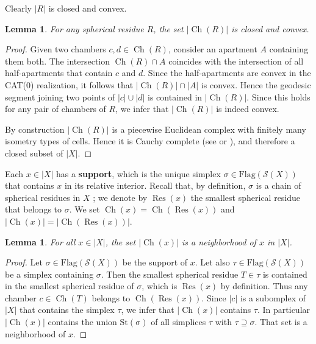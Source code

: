 \documentclass[12pt,a4paper]{amsproc}
\newtheorem{lemma}[theorem]{Lemma}
\theoremstyle{definition}
\DeclareMathOperator{\Ch}{Ch}
\DeclareMathOperator{\Res}{Res}
\begin{document}
Clearly $|R|$ is closed and convex. 

\begin{lemma}\label{lem:Ch(R)}
For any spherical residue $R$, the set $|\Ch(R)|$ is closed and convex. 
\end{lemma}
\begin{proof}
Given two chambers $c, d \in \Ch(R)$, consider an apartment $A$ containing them both. The intersection $\Ch(R) \cap A$ coincides with the intersection of all half-apartments that contain $c$ and $d$. Since the half-apartments are convex in the CAT($0$) realization, it follows that $|\Ch(R)| \cap |A|$ is convex. Hence the geodesic segment joining two points of $|c| \cup |d|$ is contained in $|\Ch(R)|$. Since this holds for any pair of chambers of $R$, we infer that $|\Ch(R)|$ is indeed convex. 

By construction $|\Ch(R)|$ is a piecewise Euclidean complex with finitely many isometry types of cells. Hence it is Cauchy complete (see \cite[pp.~105--111]{BH99} or \cite[Proposition~I.3.4]{Davis}), and therefore   a closed subset of $|X|$. 
\end{proof}
		

Each $x \in |X|$ has a \textbf{support}, which is the unique simplex $\sigma \in \mathrm{Flag}(\mathcal S(X))$ that contains $x$ in its relative interior. Recall that, by definition, $\sigma$ is a chain of spherical residues in $X$ ; we denote by $\Res(x)$ the smallest spherical residue that belongs to $\sigma$.
We set $\Ch(x) = \Ch(\Res(x))$ and $|\Ch(x)| = |\Ch(\Res(x))|$.


\begin{lemma}\label{lem:Ch(x)}
For all $x \in |X|$, the set $|\Ch(x)|$ is a neighborhood of $x$ in $|X|$.
\end{lemma}
\begin{proof}
Let $\sigma\in \mathrm{Flag}(\mathcal S(X))$ be the support of $x$. Let also $\tau \in \mathrm{Flag}(\mathcal S(X))$ be a simplex  containing $\sigma$. Then the smallest spherical residue $T\in \tau$ is contained in the smallest spherical residue of $\sigma$, which is $\Res(x)$ by definition. Thus any chamber $c \in \Ch(T)$ belongs to $\Ch(\Res(x))$. Since $|c|$ is a subomplex of $|X|$ that contains the simplex $\tau$, we infer that $|\Ch(x)|$ contains $\tau$. In particular $|\Ch(x)|$ contains the union $\mathrm{St(\sigma)}$ of all simplices $\tau$ with $\tau \supseteq \sigma$. That set  is a neighborhood of $x$.
\end{proof}
	
	
\end{document}
